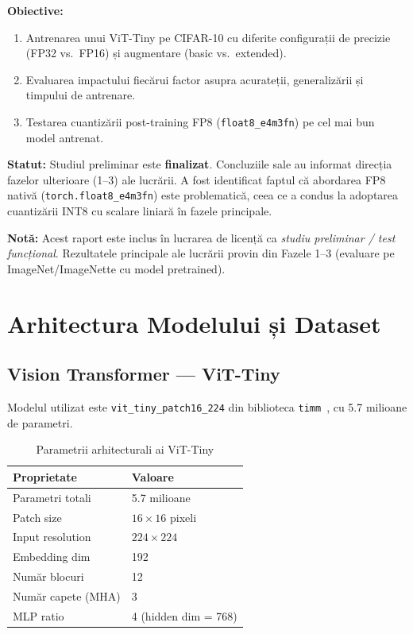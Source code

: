 \documentclass[12pt,a4paper]{article}
\begin{document}
\textbf{Obiective:}
\begin{enumerate}
  \item Antrenarea unui ViT-Tiny pe CIFAR-10 cu diferite configurații de
    precizie (FP32 vs.\ FP16) și augmentare (basic vs.\ extended).
  \item Evaluarea impactului fiecărui factor asupra acurateții, generalizării
    și timpului de antrenare.
  \item Testarea cuantizării post-training FP8 (\texttt{float8\_e4m3fn}) pe
    cel mai bun model antrenat.
\end{enumerate}

\textbf{Statut:} Studiul preliminar este \textbf{finalizat}. Concluziile sale
au informat direcția fazelor ulterioare (1--3) ale lucrării. A fost identificat
faptul că abordarea FP8 nativă (\texttt{torch.float8\_e4m3fn}) este
problematică, ceea ce a condus la adoptarea cuantizării INT8 cu scalare liniară
în fazele principale.

\textbf{Notă:} Acest raport este inclus în lucrarea de licență ca \emph{studiu
preliminar / test funcțional}. Rezultatele principale ale lucrării provin din
Fazele 1--3 (evaluare pe ImageNet/ImageNette cu model pretrained).

\section{Arhitectura Modelului și Dataset}

\subsection{Vision Transformer --- ViT-Tiny}

Modelul utilizat este \texttt{vit\_tiny\_patch16\_224} din biblioteca
\texttt{timm}~\cite{timm}, cu 5.7 milioane de parametri.

\begin{table}[H]
  \centering
  \caption{Parametrii arhitecturali ai ViT-Tiny}
  \begin{tabular}{ll}
    \toprule
    \textbf{Proprietate} & \textbf{Valoare} \\
    \midrule
    Parametri totali    & 5.7 milioane \\
    Patch size          & $16 \times 16$ pixeli \\
    Input resolution    & $224 \times 224$ \\
    Embedding dim       & 192 \\
    Număr blocuri       & 12 \\
    Număr capete (MHA)  & 3 \\
    MLP ratio           & 4 (hidden dim = 768) \\
    \bottomrule
  \end{tabular}
  \label{tab:vit_config_prelim}
\end{table}
\end{document}
